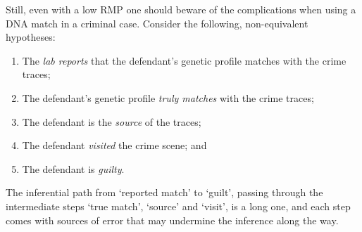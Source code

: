 \documentclass[10pt]{article}
\begin{document}
Still, even with a low RMP one should beware of the complications when using a DNA match in a criminal case. %
Consider the following, non-equivalent hypotheses: %

\begin{enumerate}

	\item 
The \textit{lab reports} that the defendant's 
genetic profile matches with the crime traces;

	\item 
The defendant's genetic profile \textit{truly matches} with the crime traces; 

	\item 
The defendant is the \textit{source} of the traces; 


	\item 
The defendant \textit{visited} the crime scene;  and


	\item 
The defendant is \textit{guilty}.
\end{enumerate}

\noindent
The inferential path from `reported match' 
to `guilt', passing through the intermediate steps `true match', `source' and `visit', is a long one, 
and each step comes with sources of error that may undermine the inference along the way. 
\end{document}
